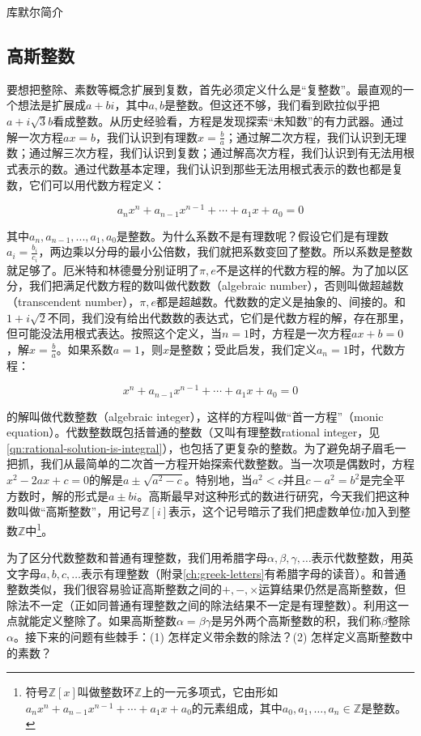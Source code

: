 \documentclass[b5paper]{ctexart}
\begin{document}
\begin{mdframed}
库默尔简介
\end{mdframed}

\subsection{高斯整数}

要想把整除、素数等概念扩展到复数，首先必须定义什么是“复整数”。最直观的一个想法是扩展成$a + bi$，其中$a, b$是整数。但这还不够，我们看到欧拉似乎把$a + i\sqrt{3}b$看成整数。从历史经验看，方程是发现探索“未知数”的有力武器。通过解一次方程$ax = b$，我们认识到有理数$x = \frac{b}{a}$；通过解二次方程，我们认识到无理数；通过解三次方程，我们认识到复数；通过解高次方程，我们认识到有无法用根式表示的数。通过代数基本定理，我们认识到那些无法用根式表示的数也都是复数，它们可以用代数方程定义：

\[
a_n x^n + a_{n-1} x^{n-1} + \dotsb + a_1 x + a_0 = 0
\]

其中$a_n, a_{n-1}, ..., a_1, a_0$是整数。为什么系数不是有理数呢？假设它们是有理数$a_i = \frac{b_i}{c_i}$，两边乘以分母的最小公倍数，我们就把系数变回了整数。所以系数是整数就足够了。厄米特和林德曼分别证明了$\pi, e$不是这样的代数方程的解。为了加以区分，我们把满足代数方程的数叫做代数数（algebraic number），否则叫做超越数（transcendent number），$\pi, e$都是超越数。代数数的定义是抽象的、间接的。和$1 + i\sqrt{2}$不同，我们没有给出代数数的表达式，它们是代数方程的解，存在那里，但可能没法用根式表达。按照这个定义，当$n = 1$时，方程是一次方程$ax + b = 0$，解$x = \frac{b}{a}$。如果系数$a = 1$，则$x$是整数；受此启发，我们定义$a_n = 1$时，代数方程：

\[
x^n + a_{n-1} x^{n-1} + \dotsb + a_1 x + a_0 = 0
\]

的解叫做代数整数（algebraic integer），这样的方程叫做“首一方程”（monic equation）。代数整数既包括普通的整数（又叫有理整数rational integer，见\cref{qn:rational-solution-is-integral}），也包括了更复杂的整数。为了避免胡子眉毛一把抓，我们从最简单的二次首一方程开始探索代数整数。当一次项是偶数时，方程$x^2 - 2ax + c = 0$的解是$a \pm \sqrt{a^2 - c}$。特别地，当$a^2 < c$并且$c - a^2 = b^2$是完全平方数时，解的形式是$a \pm bi$。高斯最早对这种形式的数进行研究，今天我们把这种数叫做“高斯整数”，用记号$\mathbb{Z}[i]$表示，这个记号暗示了我们把虚数单位$i$加入到整数$\mathbb{Z}$中\footnote{符号$\mathbb{Z}[x]$叫做整数环$\mathbb{Z}$上的一元多项式，它由形如$a_n x^n + a_{n-1} x^{n-1} + \dotsb + a_1 x + a_0$的元素组成，其中$a_0, a_1, \dotsc, a_n \in \mathbb{Z}$是整数。}。

为了区分代数整数和普通有理整数，我们用希腊字母$\alpha, \beta, \gamma, \dotsc$表示代数整数，用英文字母$a, b, c, \dotsc$表示有理整数（附录\ref{ch:greek-letters}有希腊字母的读音）。和普通整数类似，我们很容易验证高斯整数之间的$+, -, \times$运算结果仍然是高斯整数，但除法不一定（正如同普通有理整数之间的除法结果不一定是有理整数）。利用这一点就能定义整除了。如果高斯整数$\alpha = \beta\gamma$是另外两个高斯整数的积，我们称$\beta$整除$\alpha$。接下来的问题有些棘手：(1) 怎样定义带余数的除法？(2) 怎样定义高斯整数中的素数？
\end{document}
